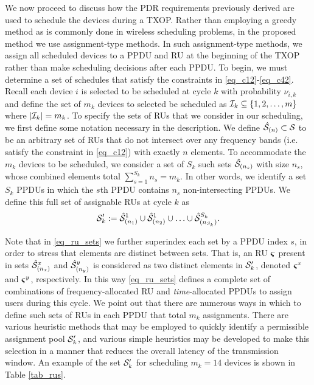 We now proceed to discuss how the PDR requirements previously derived are used to schedule the devices during a TXOP. Rather than employing a greedy method as is commonly done in wireless scheduling problems, in the proposed method we use assignment-type methods. In such assignment-type methods, we assign all scheduled devices to a PPDU and RU at the beginning of the TXOP rather than make scheduling decisions after each PPDU. To begin, we must determine a set of schedules that satisfy the constraints in \eqref{eq_c12}-\eqref{eq_c42}. Recall each device $i$ is selected to be scheduled at cycle $k$ with probability $\nu_{i,k}$ and define the set of $m_k$ devices to selected be scheduled as ${\mathcal I}_k \subseteq \{1,2,\hdots,m\}$ where  $| {\mathcal I}_k| = m_k$. To specify the sets of RUs that we consider in our scheduling, we first define some notation necessary in the description. We define $\hat{{\mathcal S}}_{(n)} \subset {\ensuremath{\mathcal S}}$ to be an arbitrary set of RUs that do not intersect over any frequency bands (i.e. satisfy the constraint in \eqref{eq_c12}) with exactly $n$ elements. To accommodate the $m_k$ devices to be scheduled, we consider a set of $S_k$ such sets  $\hat{{\mathcal S}}_{(n_s)}$ with size $n_s$, whose combined elements total $\sum_{s=1}^{S_k} n_s = m_k$. In other words, we identify a set $S_k$ PPDUs in which the $s$th PPDU contains $n_s$ non-intersecting PPDUs. We define this full set of assignable RUs at cycle $k$ as
%
\begin{align}\label{eq_ru_sets}
\ccalS'_k :=\hat{\ccalS}^1_{(n_1)} \cup \hat{\ccalS}^1_{(n_2)} \cup \hdots \cup \hat{\ccalS}^{S_k}_{(n_{S_k})}.
\end{align}
%

Note that in \eqref{eq_ru_sets} we further superindex each set by a PPDU index $s$, in order to stress that elements are distinct between sets. That is, an RU $\boldsymbol{\varsigma}$ present in sets $\hat{{\mathcal S}}^x_{(n_x)}$ and $\hat{{\mathcal S}}^y_{(n_y)}$ is considered as two distinct elements in ${\mathcal S}'_k$, denoted $\boldsymbol{\varsigma}^x$ and $\boldsymbol{\varsigma}^y$, respectively. In this way \eqref{eq_ru_sets} defines a complete set of  combinations of frequency-allocated RU and \emph{time}-allocated PPDUs to assign users during this cycle. We point out that there are numerous ways in which to define such sets of RUs in each PPDU that total $m_k$ assignments. There are various heuristic methods that may be employed to quickly identify a permissible assignment pool ${\mathcal S}'_k$, and various simple heuristics may be developed to make this selection in a manner that reduces the overall latency of the transmission window. An example of the set ${\mathcal S}'_k$ for scheduling $m_k = 14$ devices is shown in Table \ref{tab_rus}. 

